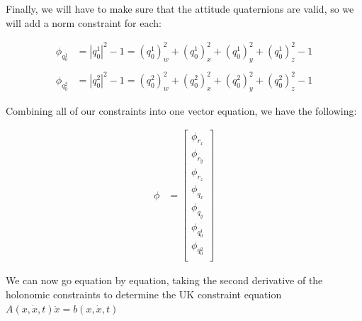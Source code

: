 \documentclass{article}
\begin{document}
Finally, we will have to make sure that the attitude quaternions are valid, so we will add a norm constraint for each:

\begin{align}
    \phi_{q_0^1} &= |q_0^1|^2 - 1 = (q_0^1)_w^2 + (q_0^1)_x^2 + (q_0^1)_y^2 + (q_0^1)_z^2 - 1 \\
    \nonumber \\
    \phi_{q_0^2} &= |q_0^2|^2 - 1 = (q_0^2)_w^2 + (q_0^2)_x^2 + (q_0^2)_y^2 + (q_0^2)_z^2 - 1
\end{align}

Combining all of our constraints into one vector equation, we have the following:

\begin{align}
    \phi &= \begin{bmatrix}
        \phi_{r_x} \\
        \phi_{r_y} \\
        \phi_{r_z} \\
        \phi_{q_x} \\
        \phi_{q_y} \\
        \phi_{q_0^1} \\
        \phi_{q_0^2} \\
        \end{bmatrix}
\end{align}

We can now go equation by equation, taking the second derivative of the holonomic constraints to determine the UK constraint equation $A(x, \dot{x}, t)\ddot{x} = b(x, \dot{x}, t)$
\end{document}
